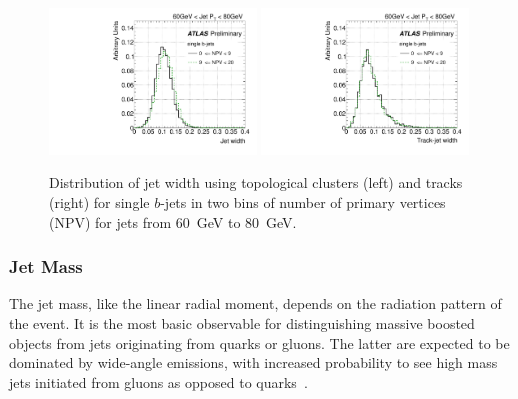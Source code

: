 \begin{figure}[tp]
\centering
\includegraphics[width=0.49\textwidth]{FIGS/systematics/Widthsingle_060.pdf}
\includegraphics[width=0.49\textwidth]{FIGS/systematics/trkWidthsingle_060.pdf}
\caption{Distribution of jet width using topological clusters (left) and tracks (right) for single $b$-jets in two bins of number of primary vertices (NPV) for jets from 60~GeV to 80~GeV.}
\label{fig:trkwidthpileup}
\end{figure}


\subsubsection{Jet Mass} 

The jet mass, like the linear radial moment, depends on the radiation pattern of the event. It is the most basic observable for distinguishing massive boosted objects from jets originating from quarks or gluons. The latter are expected to be dominated by wide-angle emissions, with increased probability to see high mass jets initiated from gluons as opposed to quarks~\cite{PhysRevD.79.074012}.  

